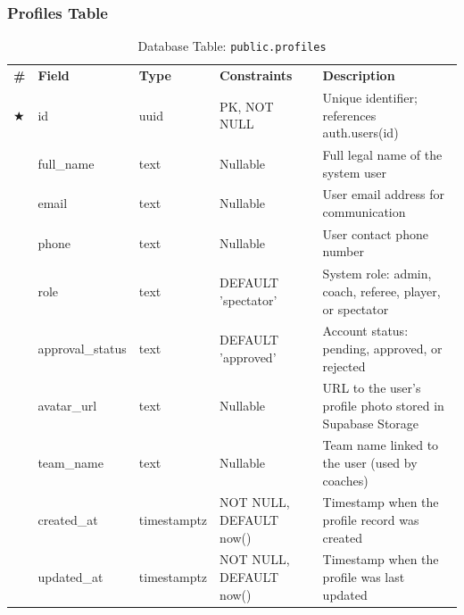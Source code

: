 \documentclass[12pt,a4paper]{report}
\begin{document}
\subsubsection{Profiles Table}
\begin{table}[H]
\centering
\caption{Database Table: \texttt{public.profiles}}
\setlength{\tabcolsep}{4pt}
\begin{tabular}{p{0.4cm}p{3.2cm}p{2.3cm}p{3.0cm}p{4.8cm}}
\rowcolor[HTML]{003087}
{\color{white}\textbf{\#}} &
{\color{white}\textbf{Field}} &
{\color{white}\textbf{Type}} &
{\color{white}\textbf{Constraints}} &
{\color{white}\textbf{Description}} \\
\rowcolor[HTML]{EEF2FF}
$\bigstar$ & id & uuid & PK, NOT NULL & Unique identifier; references auth.users(id) \\
\rowcolor[HTML]{FFFFFF}
 & full\_name & text & Nullable & Full legal name of the system user \\
\rowcolor[HTML]{EEF2FF}
 & email & text & Nullable & User email address for communication \\
\rowcolor[HTML]{FFFFFF}
 & phone & text & Nullable & User contact phone number \\
\rowcolor[HTML]{EEF2FF}
 & role & text & DEFAULT 'spectator' & System role: admin, coach, referee, player, or spectator \\
\rowcolor[HTML]{FFFFFF}
 & approval\_status & text & DEFAULT 'approved' & Account status: pending, approved, or rejected \\
\rowcolor[HTML]{EEF2FF}
 & avatar\_url & text & Nullable & URL to the user's profile photo stored in Supabase Storage \\
\rowcolor[HTML]{FFFFFF}
 & team\_name & text & Nullable & Team name linked to the user (used by coaches) \\
\rowcolor[HTML]{EEF2FF}
 & created\_at & timestamptz & NOT NULL, DEFAULT now() & Timestamp when the profile record was created \\
\rowcolor[HTML]{FFFFFF}
 & updated\_at & timestamptz & NOT NULL, DEFAULT now() & Timestamp when the profile was last updated \\
\end{tabular}
\end{table}

\end{document}
